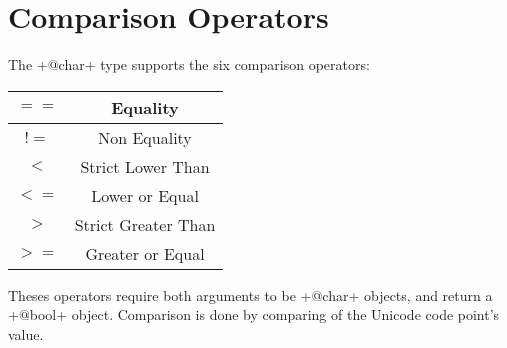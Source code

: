 \section{Comparison Operators}

The \ggst+@char+ type supports the six comparison operators:\newline

\begin{tabular}{|c|c|}
\hline
$==$ & Equality \\
\hline
$!=$ & Non Equality \\
\hline
$<$  & Strict Lower Than \\
\hline
$<=$  & Lower or Equal \\
\hline
$>$  & Strict Greater Than \\
\hline
$>=$  & Greater or Equal \\
\hline
\end{tabular}

Theses operators require both arguments to be \ggst+@char+ objects, and return a \ggst+@bool+ object. Comparison is done by comparing of the Unicode code point's value.


